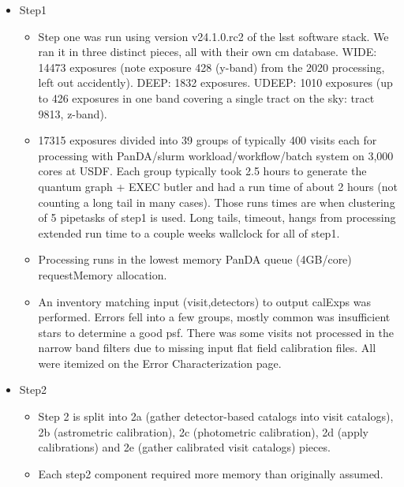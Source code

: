 \begin{itemize}

\item Step1
\begin{itemize}

  \item
Step one was run using version v24.1.0.rc2 of the lsst software stack. We ran it in three distinct pieces, all with their own cm database.  WIDE: 14473 exposures (note exposure 428 (y-band) from the 2020 processing, left out accidently). DEEP: 1832 exposures. UDEEP: 1010 exposures (up to 426  exposures in one band covering a single tract on the sky: tract 9813, z-band).  

  \item
17315 exposures divided into 39 groups of typically 400 visits each for processing with PanDA/slurm workload/workflow/batch system on 3,000 cores at USDF.  Each group typically took 2.5 hours to generate the quantum graph + EXEC butler and had a run time of about 2 hours (not counting a long tail in many cases). Those
runs times are  when clustering of 5 pipetasks of step1 is used. Long tails, timeout, hangs from processing extended run time to a couple weeks wallclock for all of step1.

\item
Processing runs in the lowest memory PanDA queue (4GB/core) requestMemory allocation.

\item An inventory matching input (visit,detectors) to output calExps was performed.  Errors fell into a few groups, mostly common was insufficient stars
to determine a good psf.  There was some visits not processed 
in the narrow band filters due to missing input flat field
calibration files.  All were itemized on the Error Characterization page.

\end{itemize} %

\item Step2

\begin{itemize}

 \item
	 Step 2 is split into 2a (gather detector-based catalogs into
		visit catalogs), 2b (astrometric calibration), 2c (photometric
		calibration), 2d (apply calibrations) and 2e (gather
		calibrated visit catalogs) pieces.

\item 
	Each step2 component required more memory than originally
	assumed.  


\end{itemize}
\end{itemize}
